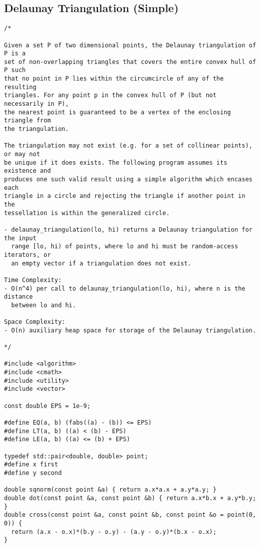 \subsection{Delaunay Triangulation (Simple)}
\begin{lstlisting}
/*

Given a set P of two dimensional points, the Delaunay triangulation of P is a
set of non-overlapping triangles that covers the entire convex hull of P such
that no point in P lies within the circumcircle of any of the resulting
triangles. For any point p in the convex hull of P (but not necessarily in P),
the nearest point is guaranteed to be a vertex of the enclosing triangle from
the triangulation.

The triangulation may not exist (e.g. for a set of collinear points), or may not
be unique if it does exists. The following program assumes its existence and
produces one such valid result using a simple algorithm which encases each
triangle in a circle and rejecting the triangle if another point in the
tessellation is within the generalized circle.

- delaunay_triangulation(lo, hi) returns a Delaunay triangulation for the input
  range [lo, hi) of points, where lo and hi must be random-access iterators, or
  an empty vector if a triangulation does not exist.

Time Complexity:
- O(n^4) per call to delaunay_triangulation(lo, hi), where n is the distance
  between lo and hi.

Space Complexity:
- O(n) auxiliary heap space for storage of the Delaunay triangulation.

*/

#include <algorithm>
#include <cmath>
#include <utility>
#include <vector>

const double EPS = 1e-9;

#define EQ(a, b) (fabs((a) - (b)) <= EPS)
#define LT(a, b) ((a) < (b) - EPS)
#define LE(a, b) ((a) <= (b) + EPS)

typedef std::pair<double, double> point;
#define x first
#define y second

double sqnorm(const point &a) { return a.x*a.x + a.y*a.y; }
double dot(const point &a, const point &b) { return a.x*b.x + a.y*b.y; }
double cross(const point &a, const point &b, const point &o = point(0, 0)) {
  return (a.x - o.x)*(b.y - o.y) - (a.y - o.y)*(b.x - o.x);
}


\end{lstlisting}

